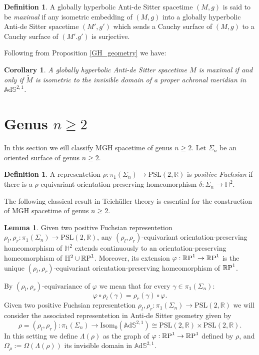 \documentclass[10pt,a4paper,oneside,reqno]{book}
\def\R{\mathbb{R}}
\def\H{\mathbb{H}}
\def\A{\mathbb{A}\mathrm{d}\mathbb{S}}
\def\S{\R\textup{P}^1}
\def\PSL{\text{PSL}(2,\R)}
\theoremstyle{plain}
\theoremstyle{definition}
\newtheorem{definition}[theorem]{Definition} %
\newtheorem{lemma}[theorem]{Lemma} %
\theoremstyle{plain}
\theoremstyle{plain}
\newtheorem{corollary}[theorem]{Corollary}
\theoremstyle{mystyleNormalFont}
\begin{document}
\begin{definition}
    A globally hyperbolic Anti-de Sitter spacetime $(M,g)$ is said to be \textit{maximal} if any isometric embedding of $(M,g)$ into a globally hyperbolic Anti-de Sitter spacetime $(M',g')$ which sends a Cauchy surface of $(M,g)$ to a Cauchy surface of $(M'.g')$ is surjective.
\end{definition}
Following from Proposition \ref{GH_geometry} we have:
\begin{corollary}
    A globally hyperbolic Anti-de Sitter spacetime $M$ is maximal if and only if $\widetilde{M}$ is isometric to the invisible domain of a proper achronal meridian in $\A^{2,1}$.
\end{corollary}

\section{Genus $n\geq 2$}
In this section we eill classify MGH spacetime of genus $n\geq 2$.
Let $\Sigma_n$ be an oriented surface of genus $n\geq 2$.
\begin{definition}
    A representetion $\rho: \pi_1(\Sigma_n) \to \PSL$ is \textit{positive Fuchsian} if there is a $\rho$-equivariant orientation-preserving homeomorphism $\delta : \widetilde{\Sigma_n}\to\H^2$.
\end{definition}
The following classical result in Teich\"uller theory is essential for the construction of MGH spacetime of genus $n\geq 2$.
\begin{lemma}
    Given two positive Fuchsian representetion $\rho_l, \rho_r : \pi_1(\Sigma_n) \to \PSL$, any $(\rho_l, \rho_r)$-equivariant orientation-preserving homeomorphism of $\H^2$ extends continuously to an orientation-preserving homeomorphism of $\H^2\cup\S$. Moreover, its extension $\varphi : \S\to\S$ is the unique $(\rho_l, \rho_r)$-equivariant orientation-preserving homeomorphism of $\S$.
\end{lemma}
By $(\rho_l, \rho_r)$-equivariance of $\varphi$ we mean that for every $\gamma \in \pi_1(\Sigma_n)$:
\[
    \varphi \circ \rho_l(\gamma) = \rho_r(\gamma)\circ\varphi.
\]
Given two positive Fuchsian representetion $\rho_l, \rho_r : \pi_1(\Sigma_n) \to \PSL$ we will consider the associated representetion in Anti-de Sitter geometry given by
\[
    \rho = (\rho_l, \rho_r) : \pi_1(\Sigma_n) \to \text{Isom}_0(\A^{2,1}) \cong \PSL \times \PSL.
\]
In this setting we define $\Lambda(\rho)$ as the graph of $\varphi: \S\to\S$ defined by $\rho$, and $\Omega_\rho := \Omega(\Lambda(\rho))$ its invisible domain in $\A^{2,1}$.
\end{document}
